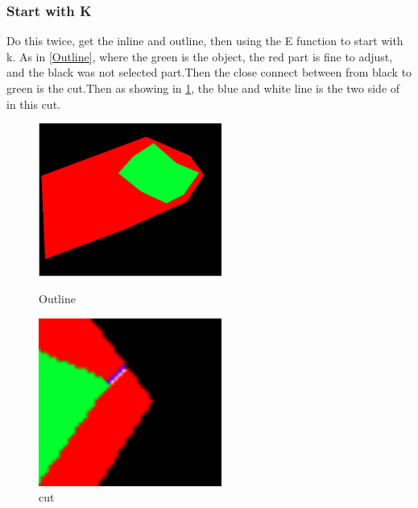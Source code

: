 \documentclass[letterpaper,12pt]{article}
\begin{document}
\subsubsection{Start with K}
Do this twice, get the inline and outline, then using the E function to start with k. As in \ref{Outline}, where
the green is the object, the red part is fine to adjust, and the black was not selected part.Then the close connect between from black to green is the cut.Then as showing in \ref{cut}, the blue and white line is the two side of in this cut.
\begin{figure}[htbp]
	\centering
	\begin{minipage}[t]{0.48\textwidth}
		\centering
		\includegraphics[width=6cm]{Image/4-1.png}
		\caption{Outline}
		\label{Outline}
	\end{minipage}
	\begin{minipage}[t]{0.48\textwidth}
		\centering
		\includegraphics[width=6cm]{Image/4-2.png}
		\caption{cut}
		\label{cut}
	\end{minipage}
\end{figure}
\end{document}
